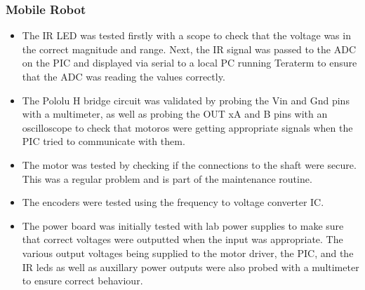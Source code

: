 \documentclass[11pt,a4paper]{article}
\begin{document}
    \subsubsection{Mobile Robot}
      \begin{itemize}
        \item The IR LED was tested firstly with a scope to check that the voltage was in the correct magnitude and range. Next, the IR signal was passed to the ADC on the PIC and displayed via serial to a local PC running Teraterm to ensure that the ADC was reading the values correctly.
        \item The Pololu H bridge circuit was validated by probing the Vin and Gnd pins with a multimeter, as well as probing the OUT xA and B pins with an oscilloscope to check that motoros were getting appropriate signals when the PIC tried to communicate with them.
        \item The motor was tested by checking if the connections to the shaft were secure. This was a regular problem and is part of the maintenance routine.
        \item The encoders were tested using the frequency to voltage converter IC.
        \item The power board was initially tested with lab power supplies to make sure that correct voltages were outputted when the input was appropriate. The various output voltages being supplied to the motor driver, the PIC, and the IR leds as well as auxillary power outputs were also probed with a multimeter to ensure correct behaviour.

      \end{itemize}
\end{document}
